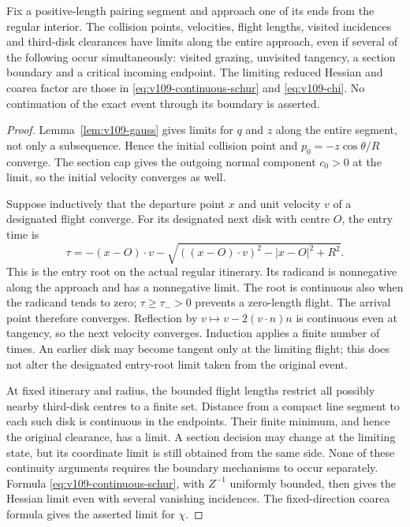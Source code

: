 \begin{lemma}
\label{lem:v110-simultaneous}
Fix a positive-length pairing segment and approach one of its ends
from the regular interior. The collision points, velocities, flight
lengths, visited incidences and third-disk clearances have limits
along the entire approach, even if several of the following occur
simultaneously: visited grazing, unvisited tangency, a section
boundary and a critical incoming endpoint. The limiting reduced
Hessian and coarea factor are those in
\eqref{eq:v109-continuous-schur} and \eqref{eq:v109-chi}.
No continuation of the exact event through its boundary is asserted.
\end{lemma}
\begin{proof}
Lemma~\ref{lem:v109-gauss} gives limits for $q$ and $z$ along the
entire segment, not only a subsequence. Hence the initial collision
point and $p_0=-z\cos\theta/R$ converge. The section cap gives the
outgoing normal component $c_0>0$ at the limit, so the initial
velocity converges as well.

Suppose inductively that the departure point $x$ and unit velocity
$v$ of a designated flight converge. For its designated next disk
with centre $O$, the entry time is
\[
 \tau=-(x-O)\cdot v
       -\sqrt{((x-O)\cdot v)^2-|x-O|^2+R^2}.
\]
This is the entry root on the actual regular itinerary. Its
radicand is nonnegative along the approach and has a nonnegative
limit. The root is continuous also when the radicand tends to zero;
$\tau\ge\tau_->0$ prevents a zero-length flight. The arrival point
therefore converges. Reflection by
$v\mapsto v-2(v\cdot n)n$ is continuous even at tangency, so the
next velocity converges. Induction applies a finite number of times.
An earlier disk may become tangent only at the limiting flight;
this does not alter the designated entry-root limit taken from the
original event.

At fixed itinerary and radius, the bounded flight lengths restrict
all possibly nearby third-disk centres to a finite set. Distance
from a compact line segment to each such disk is continuous in the
endpoints. Their finite minimum, and hence the original clearance,
has a limit. A section decision may change at the limiting state,
but its coordinate limit is still obtained from the same side.
None of these continuity arguments requires the boundary mechanisms
to occur separately. Formula \eqref{eq:v109-continuous-schur}, with
$Z^{-1}$ uniformly bounded, then gives the Hessian limit even with
several vanishing incidences. The fixed-direction coarea formula
gives the asserted limit for $\chi$.
\end{proof}

